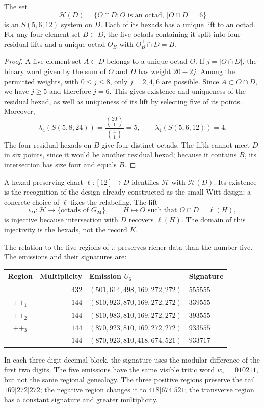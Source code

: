 \begin{proposition}
\label{exc:residuo-binario}
The set
\[
 \mathcal H(D)=
 \{O\cap D: O\text{ is an octad},\ |O\cap D|=6\}
\]
is an $S(5,6,12)$ system on $D$. Each of its hexads has
a unique lift to an octad. For any four-element set $B\subset D$,
the five octads containing it split into four residual
lifts and a unique octad $O_B^\perp$ with $O_B^\perp\cap D=B$.
\end{proposition}

\begin{proof}
A five-element set $A\subset D$ belongs to a unique octad $O$. If
$j=|O\cap D|$, the binary word given by the sum of $O$ and $D$ has weight
$20-2j$. Among the permitted weights, with $0\leq j\leq8$, only
$j=2,4,6$ are possible. Since $A\subset O\cap D$, we have $j\geq5$
and therefore $j=6$. This gives existence and uniqueness of the residual
hexad, as well as uniqueness of its lift by selecting five of its
points. Moreover,
\[
 \lambda_4(S(5,8,24))=\frac{\binom{20}1}{\binom41}=5,
 \qquad
 \lambda_4(S(5,6,12))=4.
\]
The four residual hexads on $B$ give four distinct octads.
The fifth cannot meet $D$ in six points, since it would be another residual
hexad; because it contains $B$, its intersection has size four and
equals $B$.
\end{proof}

A hexad-preserving chart $\ell:[12]\to D$ identifies
$\mathcal H$ with $\mathcal H(D)$. Its existence is the recognition
of the design already constructed as the small Witt design; a concrete
choice of $\ell$ fixes the relabeling. The lift
\[
 \iota_D:\mathcal H\longrightarrow
       \{\text{octads of }G_{24}\},
 \qquad H\longmapsto O\text{ such that }O\cap D=\ell(H),
\]
is injective because intersection with $D$ recovers $\ell(H)$.
The domain of this injectivity is the hexads, not the record $K$.

The relation to the five regions of $\pi$ preserves richer data
than the number five. The emissions and their signatures are:
\begin{center}
\small
\begin{tabular}{@{}crll@{}}
\toprule
Region & Multiplicity & Emission $U_6$ & Signature \\
\midrule
$\perp$ & $432$ & $(501,614,498,169,272,272)$ & $555555$ \\
$++_1$ & $144$ & $(810,923,870,169,272,272)$ & $339555$ \\
$++_2$ & $144$ & $(810,983,810,169,272,272)$ & $393555$ \\
$++_3$ & $144$ & $(870,923,810,169,272,272)$ & $933555$ \\
$--$ & $144$ & $(870,923,810,418,674,521)$ & $933717$ \\
\bottomrule
\end{tabular}
\end{center}
In each three-digit decimal block, the signature uses the modular
difference of the first two digits. The five emissions have the
same visible tritic word $w_\pi=010211$, but not the same
regional genealogy. The three positive regions preserve the tail
$169|272|272$; the negative region changes it to $418|674|521$;
the transverse region has a constant signature and greater multiplicity.

